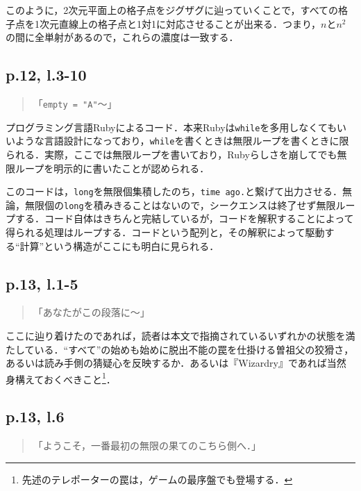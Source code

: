 \documentclass[10pt, a5paper, twoside]{jsarticle}
\theoremstyle{definition}
\begin{document}
			このように，2次元平面上の格子点をジグザグに辿っていくことで，すべての格子点を1次元直線上の格子点と1対1に対応させることが出来る．つまり，$n$と$n^2$の間に全単射があるので，これらの濃度は一致する．

		\subsection{p.12, l.3-10}

			\begin{quote}
				「\texttt{empty = "A"}〜」
			\end{quote}

			プログラミング言語Rubyによるコード．本来Rubyは\texttt{while}を多用しなくてもいいような言語設計になっており，\texttt{while}を書くときは無限ループを書くときに限られる．実際，ここでは無限ループを書いており，Rubyらしさを崩してでも無限ループを明示的に書いたことが認められる．

			このコードは，\texttt{long}を無限個集積したのち，\texttt{time ago.}と繋げて出力させる．無論，無限個の\texttt{long}を積みきることはないので，シークエンスは終了せず無限ループする．コード自体はきちんと完結しているが，コードを解釈することによって得られる処理はループする．コードという配列と，その解釈によって駆動する“計算”という構造がここにも明白に見られる．

		\subsection{p.13, l.1-5}

			\begin{quote}

				「あなたがこの段落に〜」
				
			\end{quote}

			ここに辿り着けたのであれば，読者は本文で指摘されているいずれかの状態を満たしている．“すべて”の始めも始めに脱出不能の罠を仕掛ける曽祖父の狡猾さ，あるいは読み手側の猜疑心を反映するか．あるいは『Wizardry』であれば当然身構えておくべきこと\footnote{先述のテレポーターの罠は，ゲームの最序盤でも登場する．}．

		\subsection{p.13, l.6}

			\begin{quote}

				「ようこそ，一番最初の無限の果てのこちら側へ．」
				
			\end{quote}
\end{document}
